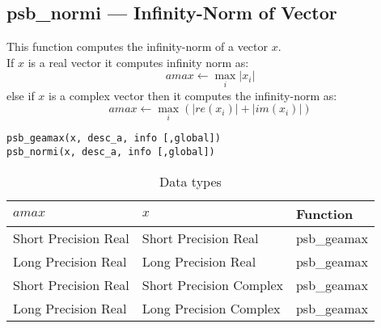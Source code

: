 \clearpage\subsection{psb\_normi --- Infinity-Norm of Vector}

This function computes 
 the infinity-norm of a vector $x$.\\
If $x$ is a real  vector
it computes infinity norm as:
\[ amax \leftarrow \max_i |x_i|\]
else if $x$ is a complex vector then it computes the infinity-norm  as:
\[ amax \leftarrow \max_i {(|re(x_i)| + |im(x_i)|)}\]

\begin{verbatim}
psb_geamax(x, desc_a, info [,global])
psb_normi(x, desc_a, info [,global])
\end{verbatim}

\begin{table}[h]
\begin{center}
\begin{tabular}{lll}
\hline
$amax$ & $x$ & {\bf Function}\\
\hline
Short Precision Real& Short Precision Real & psb\_geamax \\
Long Precision Real&Long Precision Real & psb\_geamax \\
Short Precision Real&Short Precision Complex & psb\_geamax \\
Long Precision Real&Long Precision Complex & psb\_geamax \\
\hline
\end{tabular}
\end{center}
\caption{Data types\label{tab:f90amax}}
\end{table}


